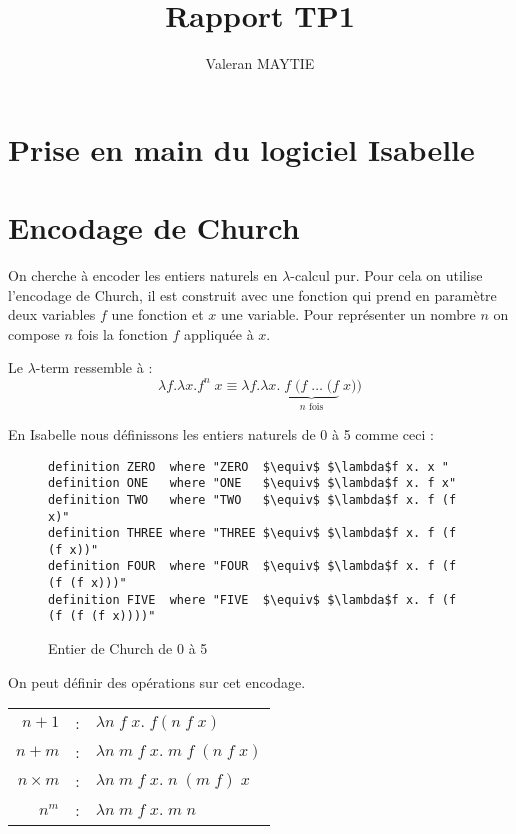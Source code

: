 \documentclass{article}
\title{Rapport TP1}
\author{Valeran MAYTIE}
\date{}
\theoremstyle{plain}
\begin{document}
  \maketitle

  \section{Prise en main du logiciel Isabelle}

  \section{Encodage de Church}
    On cherche à encoder les entiers naturels en $\lambda$-calcul pur. Pour cela
    on utilise l'encodage de Church, il est construit avec une fonction qui
    prend en paramètre deux variables $f$ une fonction et $x$ une variable. Pour
    représenter un nombre $n$ on compose $n$ fois la fonction $f$ appliquée
    à $x$.

    Le $\lambda$-term ressemble à :
    $$
      \lambda f.\lambda x. f^n\;x \equiv 
      \lambda f.\lambda x.\;\underbrace{f\;(f\;\ldots\;(f}_{n\text{ fois}}\; x))
    $$

    En Isabelle nous définissons les entiers naturels de 0 à 5 comme ceci :

    \begin{figure}[thpb]
    \begin{lstlisting}
definition ZERO  where "ZERO  $\equiv$ $\lambda$f x. x "
definition ONE   where "ONE   $\equiv$ $\lambda$f x. f x"
definition TWO   where "TWO   $\equiv$ $\lambda$f x. f (f x)"
definition THREE where "THREE $\equiv$ $\lambda$f x. f (f (f x))"
definition FOUR  where "FOUR  $\equiv$ $\lambda$f x. f (f (f (f x)))"
definition FIVE  where "FIVE  $\equiv$ $\lambda$f x. f (f (f (f (f x))))"
    \end{lstlisting}
    \caption{Entier de Church de 0 à 5}
    \label{fig:number}
    \end{figure}

    On peut définir des opérations sur cet encodage.

  \begin{center}
    \begin{tabular}{r c l}
      $n + 1$      & : & $\lambda n\;f\;x.\;f (n\;f\;x)$          \\
      $n + m$      & : & $\lambda n\; m\;f\;x.\;m\; f\;(n\;f\;x)$ \\
      $n \times m$ & : & $\lambda n\; m\;f\;x.\;n\;(m\;f)\;x$     \\
      $n^m$        & : & $\lambda n\; m\;f\;x.\;m\; n$            \\
    \end{tabular}
  \end{center}
\end{document}
